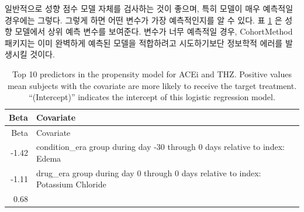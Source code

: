 \documentclass[11pt]{book}
\theoremstyle{definition}
\theoremstyle{definition}
\theoremstyle{definition}
\theoremstyle{remark}
\begin{document}
일반적으로 성향 점수 모델 자체를 검사하는 것이 좋으며, 특히 모델이 매우
예측적일 경우에는 그렇다. 그렇게 하면 어떤 변수가 가장 예측적인지를 알
수 있다. 표 \ref{tab:psModel} 은 성향 모델에서 상위 예측 변수를
보여준다. 변수가 너무 예측적일 경우, CohortMethod 패키지는 이미 완벽하게
예측된 모델을 적합하려고 시도하기보단 정보학적 에러를 발생시킬 것이다.

\begin{longtable}[]{@{}rl@{}}
\caption{\label{tab:psModel} Top 10 predictors in the propensity model for
ACEi and THZ. Positive values mean subjects with the covariate are more
likely to receive the target treatment. ``(Intercept)'' indicates the
intercept of this logistic regression model.}\tabularnewline
\toprule
\begin{minipage}[b]{0.07\columnwidth}\raggedleft\strut
Beta\strut
\end{minipage} & \begin{minipage}[b]{0.87\columnwidth}\raggedright\strut
Covariate\strut
\end{minipage}\tabularnewline
\midrule
\endfirsthead
\toprule
\begin{minipage}[b]{0.07\columnwidth}\raggedleft\strut
Beta\strut
\end{minipage} & \begin{minipage}[b]{0.87\columnwidth}\raggedright\strut
Covariate\strut
\end{minipage}\tabularnewline
\midrule
\endhead
\begin{minipage}[t]{0.07\columnwidth}\raggedleft\strut
-1.42\strut
\end{minipage} & \begin{minipage}[t]{0.87\columnwidth}\raggedright\strut
condition\_era group during day -30 through 0 days relative to index:
Edema\strut
\end{minipage}\tabularnewline
\begin{minipage}[t]{0.07\columnwidth}\raggedleft\strut
-1.11\strut
\end{minipage} & \begin{minipage}[t]{0.87\columnwidth}\raggedright\strut
drug\_era group during day 0 through 0 days relative to index: Potassium
Chloride\strut
\end{minipage}\tabularnewline
\begin{minipage}[t]{0.07\columnwidth}\raggedleft\strut
0.68\strut
\end{minipage} & \begin{minipage}[t]{0.87\columnwidth}\raggedright\strut

\end{minipage}
\end{longtable}
\end{document}

